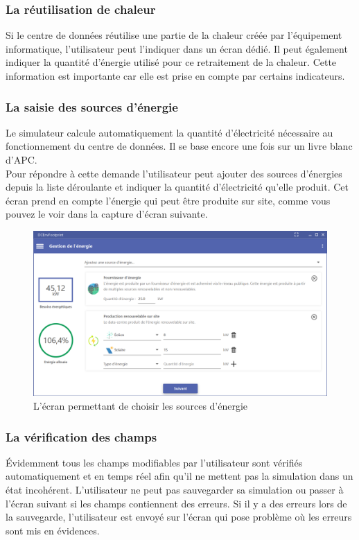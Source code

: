 \subsubsection{La réutilisation de chaleur}
Si le centre de données réutilise une partie de la chaleur créée par l'équipement informatique, l'utilisateur peut l'indiquer dans un écran dédié. Il peut également indiquer la quantité d'énergie utilisé pour ce retraitement de la chaleur. Cette information est importante car elle est prise en compte par certains indicateurs.

\subsubsection{La saisie des sources d'énergie}
Le simulateur calcule automatiquement la quantité d'électricité nécessaire au fonctionnement du centre de données. Il se base encore une fois sur un livre blanc d'APC.\\
Pour répondre à cette demande l'utilisateur peut ajouter des sources d'énergies depuis la liste déroulante et indiquer la quantité d'électricité qu'elle produit. Cet écran prend en compte l'énergie qui peut être produite sur site, comme vous pouvez le voir dans la capture d'écran suivante.

\begin{figure}[h!]
	\begin{center}
		\includegraphics[scale=0.5]{partie3/images/energie.png}
		\caption{L'écran permettant de choisir les sources d'énergie}
	\end{center}
\end{figure}

\subsubsection{La vérification des champs}
Évidemment tous les champs modifiables par l'utilisateur sont vérifiés automatiquement et en temps réel afin qu'il ne mettent pas la simulation dans un état incohérent. L'utilisateur ne peut pas sauvegarder sa simulation ou passer à l'écran suivant si les champs contiennent des erreurs. Si il y a des erreurs lors de la sauvegarde, l'utilisateur est envoyé sur l'écran qui pose problème où les erreurs sont mis en évidences.

